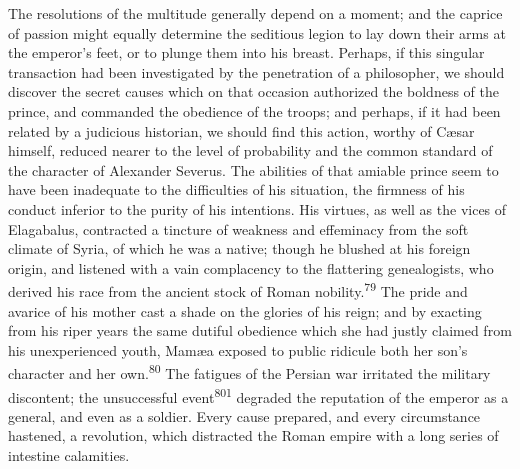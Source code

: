 


The resolutions of the multitude generally depend on a moment;
and the caprice of passion might equally determine the seditious
legion to lay down their arms at the emperor’s feet, or to plunge
them into his breast. Perhaps, if this singular transaction had
been investigated by the penetration of a philosopher, we should
discover the secret causes which on that occasion authorized the
boldness of the prince, and commanded the obedience of the
troops; and perhaps, if it had been related by a judicious
historian, we should find this action, worthy of Cæsar himself,
reduced nearer to the level of probability and the common
standard of the character of Alexander Severus. The abilities of
that amiable prince seem to have been inadequate to the
difficulties of his situation, the firmness of his conduct
inferior to the purity of his intentions. His virtues, as well as
the vices of Elagabalus, contracted a tincture of weakness and
effeminacy from the soft climate of Syria, of which he was a
native; though he blushed at his foreign origin, and listened
with a vain complacency to the flattering genealogists, who
derived his race from the ancient stock of Roman nobility.\textsuperscript{79} The
pride and avarice of his mother cast a shade on the glories of
his reign; and by exacting from his riper years the same dutiful
obedience which she had justly claimed from his unexperienced
youth, Mamæa exposed to public ridicule both her son’s character
and her own.\textsuperscript{80} The fatigues of the Persian war irritated the
military discontent; the unsuccessful event\textsuperscript{801} degraded the
reputation of the emperor as a general, and even as a soldier.
Every cause prepared, and every circumstance hastened, a
revolution, which distracted the Roman empire with a long series
of intestine calamities.


